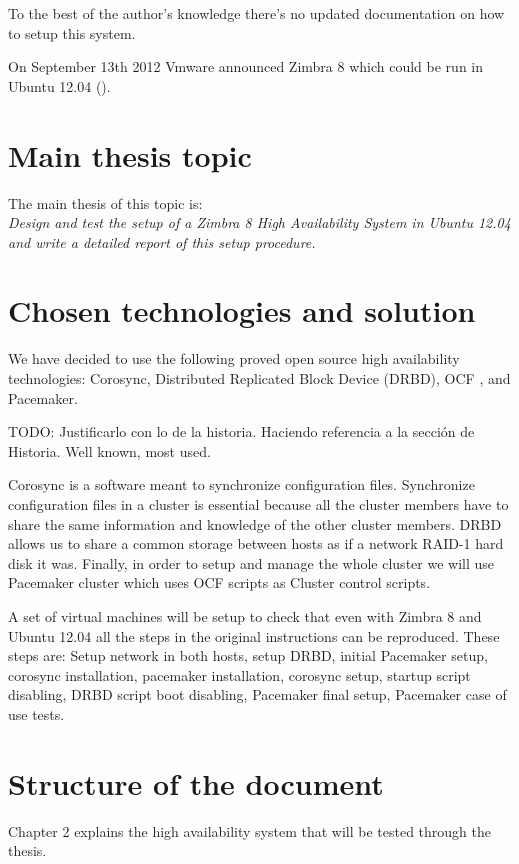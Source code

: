 To the best of the author's knowledge there's no updated documentation on how to setup this system.

On September 13th 2012 Vmware announced Zimbra 8 which could be run in Ubuntu 12.04 (\cite{VmwareZimbra8Announce}).

\section {Main thesis topic}
The main thesis of this topic is: \\
\textit{Design and test the setup of a Zimbra 8 High Availability System in Ubuntu 12.04 and write a detailed report of this setup procedure.}

\section {Chosen technologies and solution}
We have decided to use the following proved open source high availability technologies: Corosync, Distributed Replicated Block Device (DRBD), OCF , and Pacemaker.

TODO: Justificarlo con lo de la historia. Haciendo referencia a la secci\'on de Historia. Well known, most used.

Corosync is a software meant to synchronize configuration files. Synchronize configuration files in a cluster is essential because all the cluster members have to share the same information and knowledge of the other cluster members. DRBD allows us to share a common storage between hosts as if a network RAID-1 hard disk it was. Finally, in order to setup and manage the whole cluster we will use Pacemaker cluster which uses OCF scripts as Cluster control scripts.

A set of virtual machines will be setup to check that even with Zimbra 8 and Ubuntu 12.04 all the steps in the original instructions can be reproduced. These steps are: Setup network in both hosts, setup DRBD, initial Pacemaker setup, corosync installation, pacemaker installation, corosync setup, startup script disabling, DRBD script boot disabling, Pacemaker final setup, Pacemaker case of use tests.

\section {Structure of the document}

Chapter 2 explains the high availability system that will be tested through the thesis.

